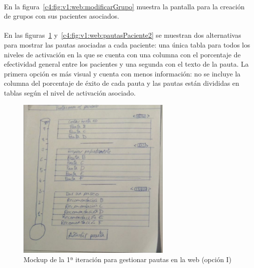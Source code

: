 \paragraph{}
En la figura~\ref{c4:fig:v1:web:modificarGrupo} muestra la pantalla para la creación de grupos con sus pacientes asociados.

\paragraph{}
En las figuras~\ref{c4:fig:v1:web:pautasPaciente} y~\ref{c4:fig:v1:web:pautasPaciente2} se muestran dos alternativas para mostrar las pautas asociadas a cada paciente: una única tabla para todos los niveles de activación en la que se cuenta con una columna con el porcentaje de efectividad general entre los pacientes y una segunda con el texto de la pauta. La primera opción es más visual y cuenta con menos información: no se incluye la columna del porcentaje de éxito de cada pauta y las pautas están divididas en tablas según el nivel de activación asociado.

\begin{figure}[H]
    \centering
    \includegraphics[width=0.7\linewidth, height=8cm]{Imagenes/04DescProblema/mockups/v1/web/04-pautasPaciente.png}
    \caption[Mockup de la 1ª iteración para gestionar pautas en la web (opción I)]{Mockup de la 1ª iteración para gestionar pautas en la web (opción I)}
    \label{c4:fig:v1:web:pautasPaciente}
\end{figure}

